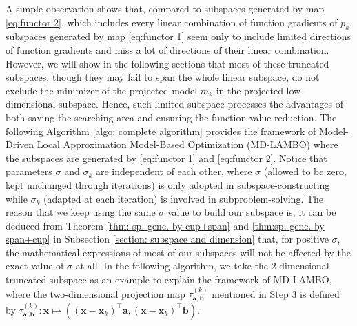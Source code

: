 \documentclass[colorlinks=true, linkcolor=blue, citecolor=blue, urlcolor=blue]{article}
\theoremstyle{plain}
\theoremstyle{definition}
\theoremstyle{remark}
\begin{document}
A simple observation shows that, compared to subspaces generated by map \eqref{eq:functor 2}, which includes every linear combination of function gradients of $p_k$, subspaces generated by map \eqref{eq:functor 1} seem only to include limited directions of function gradients and
miss a lot of directions of their linear combination. However, we will show in the following sections that most of these truncated subspaces, though they may fail to span the whole linear subspace, do not exclude the minimizer of the projected model $m_k$ in the projected low-dimensional subspace. Hence, such limited subspace processes the advantages of both saving the searching area and ensuring the function value reduction. 
The following Algorithm \ref{algo: complete algorithm} provides the framework of {M}odel-{D}riven {L}ocal {A}pproximation {M}odel-{B}ased {O}ptimization (MD-LAMBO) where the subspaces are generated by \eqref{eq:functor 1} and \eqref{eq:functor 2}. Notice that parameters $\sigma$ and $\sigma_k$ are independent of each other, where $\sigma$ (allowed to be zero, kept unchanged through iterations) is only adopted in subspace-constructing while $\sigma_k$ (adapted at each iteration) is involved in subproblem-solving. The reason that we keep using the same $\sigma$ value to build our subspace is, it can be deduced from Theorem \ref{thm: sp. gene. by cup+span} and \ref{thm:sp. gene. by span+cup} in Subsection \ref{section: subspace and dimension} that, for positive $\sigma$, the mathematical expressions of most of our subspaces will not be affected by the exact value of $\sigma$ at all. 
In the following algorithm, we take the 2-dimensional truncated subspace as an example to explain the framework of MD-LAMBO, where the two-dimensional projection map $\tau^{(k)}_{\bm a,\bm b}$ mentioned in Step 3 is defined by $\tau^{(k)}_{\bm a,\bm b}:\bm x\mapsto((\bm x-\bm x_k)^\top\bm a,(\bm x-\bm x_k)^\top\bm b)$.
\end{document}

